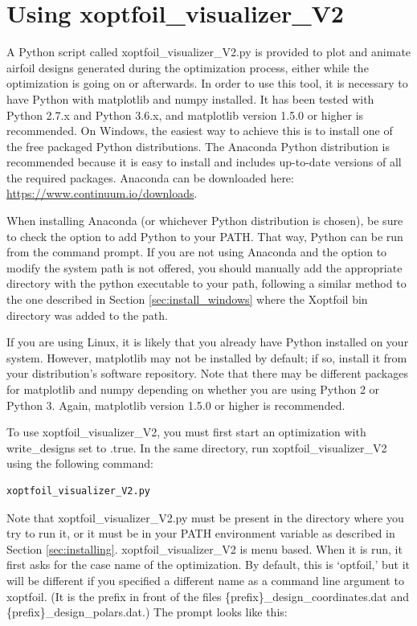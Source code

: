 \documentclass[11pt]{article}
\begin{document}
\section{Using xoptfoil\_visualizer\_V2}\label{sec:xoptfoil_visualizer_V2}

A Python script called xoptfoil\_visualizer\_V2.py is provided to plot and animate airfoil
designs generated during the optimization process, either while the optimization is going
on or afterwards.  In order to use this tool, it is
necessary to have Python with matplotlib and numpy installed. It has been tested with
Python 2.7.x and Python 3.6.x, and matplotlib version 1.5.0 or higher is recommended.
On Windows, the easiest
way to achieve this is to install one of the free packaged Python distributions.  The
Anaconda Python distribution is recommended because it is easy to install and includes
up-to-date versions of all the required packages.  Anaconda can be downloaded here:
\url{https://www.continuum.io/downloads}.

When installing Anaconda (or whichever Python distribution is chosen), be sure to check
the option to add Python to your PATH.  That way, Python can be run from the
command prompt.  If you are not using Anaconda and the option to modify the system path is
not offered, you should manually add the appropriate directory with the python executable
to your path, following a similar method to the one described in Section
\ref{sec:install_windows} where the Xoptfoil bin directory was added to the path.

If you are using Linux, it is likely that you already have Python installed on your
system.  However, matplotlib may not be installed by default; if so, install it from your
distribution's software repository.  Note that there may be different packages for 
matplotlib
and numpy depending on whether you are using Python 2 or Python 3. Again, matplotlib
version 1.5.0 or higher is recommended.

To use xoptfoil\_visualizer\_V2, you must first start an optimization with write\_designs set
to .true. In the same directory, run xoptfoil\_visualizer\_V2 using the following command:

\begin{verbatim}
xoptfoil_visualizer_V2.py
\end{verbatim}

Note that xoptfoil\_visualizer\_V2.py must be present in the directory where you try to run it,
or it must be in your PATH environment variable as described in Section
\ref{sec:installing}. xoptfoil\_visualizer\_V2 is menu based.  When it is run, 
it first asks for the case name of the optimization.  By default, this is `optfoil,' but
it will be different if you specified a different name as a command line argument to
xoptfoil. (It is the prefix in front of the files 
\{prefix\}\_design\_coordinates.dat and
\{prefix\}\_design\_polars.dat.)  The prompt looks like this:
\end{document}
